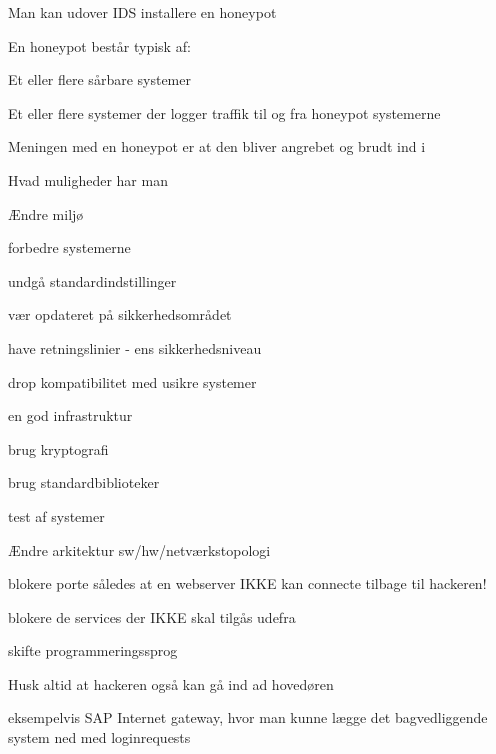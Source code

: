 \documentclass[Screen16to9,17pt]{foils}
\begin{document}

\begin{list1}
\item Man kan udover IDS installere en honeypot
\item En honeypot består typisk af:
  \begin{list2}
    \item Et eller flere sårbare systemer
\item Et eller flere systemer der logger traffik til og fra honeypot
  systemerne
  \end{list2}
\item Meningen med en honeypot er at den bliver angrebet og brudt ind
  i
\end{list1}





\begin{list1}
\item Hvad muligheder har man
  \begin{list2}
  \item Ændre miljø
  \item forbedre systemerne
  \item undgå standardindstillinger
  \item vær opdateret på sikkerhedsområdet
  \item have retningslinier - ens sikkerhedsniveau
  \item drop kompatibilitet med usikre systemer
  \item en god infrastruktur
  \item brug kryptografi
  \item brug standardbiblioteker
  \item test af systemer
  \end{list2}
\end{list1}


\begin{list1}
\item Ændre arkitektur sw/hw/netværkstopologi
  \begin{list2}
  \item blokere porte således at en webserver IKKE kan connecte tilbage til hackeren!
  \item blokere de services der IKKE skal tilgås udefra
  \item skifte programmeringssprog
  \end{list2}
\item Husk altid at hackeren også kan gå ind ad hovedøren
\item eksempelvis SAP Internet gateway, hvor man kunne lægge det
  bagvedliggende system ned med loginrequests
\end{list1}
\end{document}
